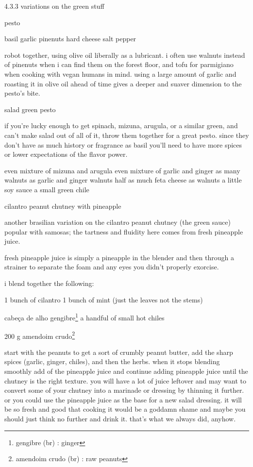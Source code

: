 4.3.3  variations on the green stuff

pesto

basil
garlic
pinenuts
hard cheese
salt
pepper

robot together, using olive oil liberally as a lubricant. i often use walnuts instead of pinenuts when i can find them on the forest floor, and tofu for parmigiano when cooking with vegan humans in mind. using a large amount of garlic and roasting it in olive oil ahead of time gives a deeper and suaver dimension to the pesto's bite.

salad green pesto

if you're lucky enough to get spinach, mizuna, arugula, or a similar green, and can't make salad out of all of it, throw them together for a great pesto. since they don't have as much history or fragrance as basil you'll need to have more spices or lower expectations of the flavor power.

even mixture of mizuna and arugula
even mixture of garlic and ginger
as many walnuts as garlic and ginger walnuts
half as much feta cheese as walnuts
a little soy sauce
a small green chile


cilantro peanut chutney with pineapple

another brasilian variation on the cilantro peanut chutney (the green sauce) popular with samosas; the tartness and fluidity here comes from fresh pineapple juice.

fresh pineapple juice is simply a pineapple in the blender and then through a strainer to separate the foam and any eyes you didn't properly exorcise.

i blend together the following:

1 bunch of cilantro
1 bunch of mint (just the leaves not the stems) 

\onehalf cabe\c{c}a de alho 
gengibre\footnote{gengibre (br) : ginger}
a handful of small hot chiles

200 g amendoim crudo\footnote{amendoim crudo (br) : raw peanuts}

start with the peanuts to get a sort of crumbly peanut butter, add the sharp spices (garlic, ginger, chiles), and then the herbs. when it stops blending smoothly add \onequarter of the pineapple juice and continue adding pineapple juice until the chutney is the right texture. you will have a lot of juice leftover and may want to convert some of your chutney into a marinade or dressing by thinning it further. or you could use the pineapple juice as the base for a new salad dressing. it will be so fresh and good that cooking it would be a goddamn shame and maybe you should just think no further and drink it. that's what we always did, anyhow.


